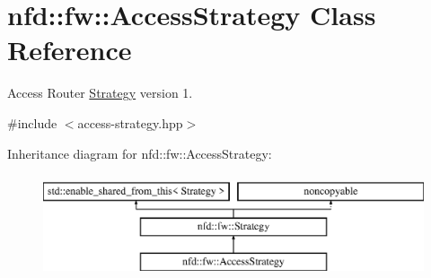 \hypertarget{classnfd_1_1fw_1_1AccessStrategy}{}\section{nfd\+:\+:fw\+:\+:Access\+Strategy Class Reference}
\label{classnfd_1_1fw_1_1AccessStrategy}


Access Router \hyperlink{classnfd_1_1fw_1_1Strategy}{Strategy} version 1.  




{\ttfamily \#include $<$access-\/strategy.\+hpp$>$}

Inheritance diagram for nfd\+:\+:fw\+:\+:Access\+Strategy\+:\begin{figure}[H]
\begin{center}
\leavevmode
\includegraphics[height=3.000000cm]{classnfd_1_1fw_1_1AccessStrategy}
\end{center}
\end{figure}
